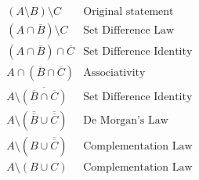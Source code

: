 \documentclass{article}
\begin{document}
\section{}
\begin{align*}
    & (A \setminus B ) \setminus C & \text{Original statement} & \\
    & (A \cap \overline{B} ) \setminus C & \text{Set Difference Law} & \\
    & (A \cap \overline{B} ) \cap \overline{C} & \text{Set Difference Identity} & \\
    & A \cap (\overline{B}  \cap \overline{C}) & \text{Associativity} & \\
    & A \setminus \overline{(\overline{B}  \cap \overline{C})} & \text{Set Difference Identity} & \\
    & A \setminus (\overline{\overline{B}}  \cup \overline{\overline{C}}) & \text{De Morgan's Law} & \\
    & A \setminus (B  \cup \overline{\overline{C}}) & \text{Complementation Law} & \\
    & A \setminus (B  \cup C) & \text{Complementation Law} &
\end{align*}
\end{document}
